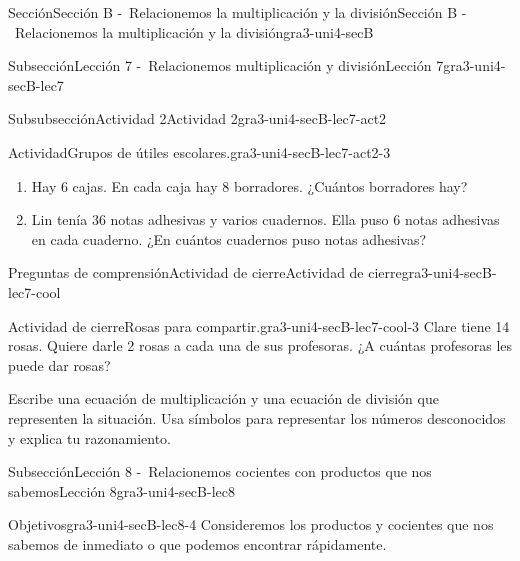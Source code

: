\documentclass[twoside,10pt,]{article}
\newlength{\fillinmaxwidth}
\newlength{\fillincontract}
\newlength{\fillinheight}
\newcommand{\fillintext}[1]{%
\setlength{\fillinmaxwidth}{#1em*\real{0.5}}%
\setlength{\fillincontract}{#1em*\real{0.5}*\real{0.2}}%
\setlength{\fillinheight}{\heightof{\strut}+1.2pt}%
\strut\nobreak\leaders\vbox{\hrule width 0.3pt height 0.3pt \vskip -1.2pt}\hskip 1\fillinmaxwidth minus \fillincontract\nobreak\strut%
}
\begin{document}
\begin{sectionptx}{Sección}{Sección B -~Relacionemos la multiplicación y la división}{}{Sección B -~Relacionemos la multiplicación y la división}{}{}{gra3-uni4-secB}
\begin{subsectionptx}{Subsección}{Lección 7 -~Relacionemos multiplicación y división}{}{Lección 7}{}{}{gra3-uni4-secB-lec7}
\begin{subsubsectionptx}{Subsubsección}{Actividad 2}{}{Actividad 2}{}{}{gra3-uni4-secB-lec7-act2}
\begin{activity}{Actividad}{Grupos de útiles escolares.}{gra3-uni4-secB-lec7-act2-3}
\begin{enumerate}
\begin{enumerate}
\item{}%
\end{enumerate}
\item{}Hay 6 cajas. En cada caja hay 8 borradores. ¿Cuántos borradores hay?%
%
\item{}Lin tenía 36 notas adhesivas y varios cuadernos. Ella puso 6 notas adhesivas en cada cuaderno. ¿En cuántos cuadernos puso notas adhesivas?%
%
\end{enumerate}
\end{activity}%
\end{subsubsectionptx}
%
%
\typeout{************************************************}
\typeout{************************************************}
%
\begin{reading-questions-subsubsection}{Preguntas de comprensión}{Actividad de cierre}{}{Actividad de cierre}{}{}{gra3-uni4-secB-lec7-cool}
\begin{project}{Actividad de cierre}{Rosas para compartir.}{gra3-uni4-secB-lec7-cool-3}%
Clare tiene 14 rosas. Quiere darle 2 rosas a cada una de sus profesoras. ¿A cuántas profesoras les puede dar rosas?%
\par
Escribe una ecuación de multiplicación y una ecuación de división que representen la situación. Usa símbolos para representar los números desconocidos y explica tu razonamiento.%
\end{project}%
\end{reading-questions-subsubsection}
\end{subsectionptx}
%
%
\typeout{************************************************}
\typeout{************************************************}
%
\begin{subsectionptx}{Subsección}{Lección 8 -~Relacionemos cocientes con productos que nos sabemos}{}{Lección 8}{}{}{gra3-uni4-secB-lec8}
\begin{objectives}{Objetivos}{gra3-uni4-secB-lec8-4}
Consideremos los productos y cocientes que nos sabemos de inmediato o que podemos encontrar rápidamente.%

\end{objectives}
\end{subsectionptx}
\end{sectionptx}
\end{document}
